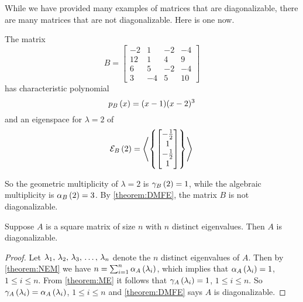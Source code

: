 \documentclass{ximera}
\begin{document}
While we have provided many examples of matrices that are
diagonalizable, there are many matrices that are not diagonalizable.
Here is one now.

\begin{example}

The matrix
\[
B=
\begin{bmatrix}
-2 & 1 & -2 & -4\\
12 & 1 & 4 & 9\\
6 & 5 & -2 & -4\\
3 & -4 & 5 & 10
\end{bmatrix}
\]
has characteristic polynomial
\[
p_{B}\left(x\right)=(x-1)(x-2)^3
\]
and an eigenspace for $\lambda=2$ of
\[
\mathcal{E}_{B}\left(2\right)=\left\langle\left\{\begin{bmatrix}-\frac{1}{2}\\1\\-\frac{1}{2}\\1\end{bmatrix}\right\}\right\rangle\\
\]

So the geometric multiplicity of $\lambda=2$ is $\gamma_{B}\left(2\right)=1$,
while the algebraic multiplicity is $\alpha_{B}\left(2\right)=3$.  By
\ref{theorem:DMFE}, the matrix $B$ is not diagonalizable.

\end{example}


\begin{theorem}
\label{theorem:DED}

Suppose $A$ is a square matrix of size $n$ with $n$ distinct eigenvalues.  Then $A$ is diagonalizable.

\begin{proof}
Let ${\lambda}_{1},\,{\lambda}_{2},\,{\lambda}_{3},\,\ldots,\,{\lambda}_{n}$ denote the $n$ distinct eigenvalues of $A$.
Then by \ref{theorem:NEM} we have $n=\sum_{i=1}^n\alpha_{A}\left(\lambda_i\right)$, which implies that $\alpha_{A}\left(\lambda_i\right)=1$, $1\leq i\leq n$.  From \ref{theorem:ME} it follows that $\gamma_{A}\left(\lambda_i\right)=1$, $1\leq i\leq n$.  So $\gamma_{A}\left(\lambda_i\right)=\alpha_{A}\left(\lambda_i\right)$, $1\leq i\leq n$ and \ref{theorem:DMFE} says $A$ is diagonalizable.

\end{proof}
\end{theorem}
\end{document}
